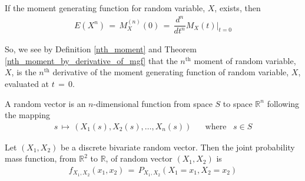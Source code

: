 \begin{theorem}
    \label{nth_moment_by_derivative_of_mgf}
    If the moment generating function for random variable, $X$, exists, then
    \begin{align*}
        E(X^{n}) \hspace{2pt} = \hspace{2pt} M_{X}^{(n)}(0) \hspace{2pt} = \hspace{2pt} \dfrac{d^{n}}{dt^{n}}M_{X}(t)\Big|_{t = 0}  
    \end{align*}
\end{theorem}

So, we see by Definition \ref{nth_moment} and Theorem \ref{nth_moment_by_derivative_of_mgf} that the $n^{\text{th}}$ moment of random variable, $X$, is the $n^{\text{th}}$ derivative of the moment generating function of random variable, $X$, evaluated at $t \hspace{2pt} = \hspace{2pt} 0$.

\begin{definition}
    A random vector is an $n$-dimensional function from space $S$ to space $\mathbb{R}^{n}$ following the mapping
    \begin{align*}
        s \hspace{2pt} \mapsto \hspace{2pt} (X_{1}(s), X_{2}(s), \dots , X_{n}(s)) \hspace{20pt} \text{where} \hspace{10pt} s \in S
    \end{align*}
\end{definition}

\begin{definition}
    Let $(X_{1}, X_{2})$ be a discrete bivariate random vector. Then the joint probability mass function, from $\mathbb{R}^{2}$ to $\mathbb{R}$, of random vector $(X_{1}, X_{2})$ is 
    \begin{align*}
        f_{X_{1}, X_{2}}(x_{1}, x_{2}) \hspace{2pt} = \hspace{2pt} P_{X_{1}, X_{2}}(X_{1} = x_{1}, X_{2} = x_{2})
    \end{align*}
\end{definition}

